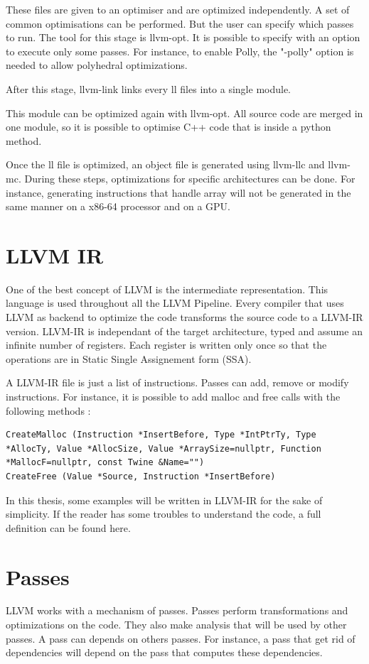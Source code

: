 These files are given to an optimiser and are optimized independently. A set of common optimisations can be performed. But the user can specify which passes to run. The tool for this stage is llvm-opt. It is possible to specify with an option to execute only some passes. For instance, to enable Polly, the "-polly" option is needed to allow polyhedral optimizations.

After this stage, llvm-link links every ll files into a single module.

This module can be optimized again with llvm-opt. All source code are merged in one module, so it is possible to optimise C++ code that is inside a python method. 

Once the ll file is optimized, an object file is generated using llvm-llc and llvm-mc. During these steps, optimizations for specific architectures can be done. For instance, generating instructions that handle array will not be generated in the same manner on a x86-64 processor and on a GPU.

\section{LLVM IR}
One of the best concept of LLVM is the intermediate representation. This language is used throughout all the LLVM Pipeline. Every compiler that uses LLVM as backend to optimize the code transforms the source code to a LLVM-IR version. LLVM-IR is independant of the target architecture, typed and assume an infinite number of registers. Each register is written only once so that the operations are in Static Single Assignement form (SSA). 

A LLVM-IR file is just a list of instructions. Passes can add, remove or modify instructions. For instance, it is possible to add malloc and free calls with the following methods :
\begin{lstlisting}[frame=single]
CreateMalloc (Instruction *InsertBefore, Type *IntPtrTy, Type *AllocTy, Value *AllocSize, Value *ArraySize=nullptr, Function *MallocF=nullptr, const Twine &Name="")
CreateFree (Value *Source, Instruction *InsertBefore)
\end{lstlisting}

In this thesis, some examples will be written in LLVM-IR for the sake of simplicity. If the reader has some troubles to understand the code, a full definition can be found here. 

\section{Passes}
LLVM works with a mechanism of passes. Passes perform transformations and optimizations on the code. They also make analysis that will be used by other passes. A pass can depends on others passes. For instance, a pass that get rid of dependencies will depend on the pass that computes these dependencies.

